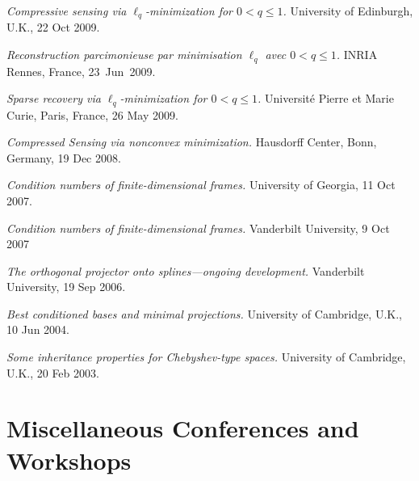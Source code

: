 \documentclass[11pt]{article}
\begin{document}
\item {\sl Compressive sensing via $\ell_q$-minimization for $0 < q \le 1$.} University of Edinburgh, U.K., 22 Oct 2009.
\item {\sl Reconstruction parcimonieuse par minimisation $\ell_q$ avec $0<q \le 1$.} INRIA Rennes, France, 23~Jun~2009.
\item {\sl Sparse recovery via $\ell_q$-minimization for $0<q \le 1$.} Universit\'e Pierre et Marie Curie, Paris, France, 26 May 2009.
\item {\sl Compressed Sensing via nonconvex minimization.} Hausdorff Center, Bonn, Germany, 19 Dec 2008.
\item {\sl Condition numbers of finite-dimensional frames.}
University of Georgia, 11 Oct 2007.
\item {\sl Condition numbers of finite-dimensional frames.} Vanderbilt University,
9 Oct 2007
\item {\sl The orthogonal projector onto splines---ongoing development.}
Vanderbilt University, 19 Sep 2006.
\item  {\sl Best conditioned bases and minimal projections.}
University of Cambridge, U.K., 10 Jun 2004.
\item {\sl Some inheritance properties for Chebyshev-type spaces.}
University of Cambridge, U.K., 20 Feb 2003.
\eitemize



\section{Miscellaneous Conferences and Workshops}
\end{document}
